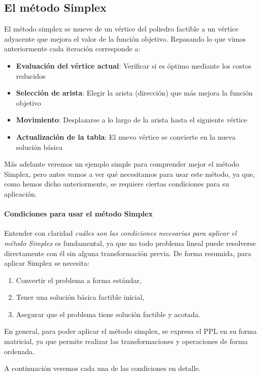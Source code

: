 \subsection{El método Simplex}
\label{sec:simplex}

El método simplex se mueve de un vértice del poliedro factible a un vértice adyacente que mejora el valor de la función objetivo. Repasando lo que vimos anteriormente cada iteración corresponde a:
\begin{itemize}
  \item \textbf{Evaluación del vértice actual}: Verificar si es óptimo mediante los costos reducidos
  \item \textbf{Selección de arista}: Elegir la arista (dirección) que más mejora la función objetivo
  \item \textbf{Movimiento}: Desplazarse a lo largo de la arista hasta el siguiente vértice
  \item \textbf{Actualización de la tabla}: El nuevo vértice se convierte en la nueva solución básica
\end{itemize}
Más adelante veremos un ejemplo simple para comprender mejor el método Simplex, pero antes vamos a ver qué necesitamos para usar este método, ya que, como hemos dicho anteriormente, se requiere ciertas condiciones para su aplicación.

\paragraph{Condiciones para usar el método Simplex}

Entender con claridad \textit{cuáles son las condiciones necesarias para aplicar el método Simplex} es fundamental, ya que no todo problema lineal puede resolverse directamente con él sin alguna transformación previa. De forma resumida, para aplicar Simplex se necesita:
\begin{enumerate}
  \item Convertir el problema a forma estándar,
  \item Tener una solución básica factible inicial,
  \item Asegurar que el problema tiene solución factible y acotada.
\end{enumerate}
En general, para poder aplicar el método simplex, se expresa el PPL en su forma matricial, ya que permite realizar las transformaciones y operaciones de forma ordenada.

A continuación veremos cada una de las condiciones en detalle.

